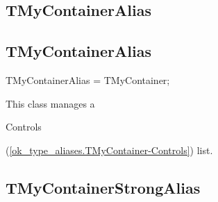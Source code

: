 \documentclass{report}
\newif\ifpdf
\begin{document}
\subsection*{\large{\textbf{TMyContainerAlias}}\normalsize\hspace{1ex}\hrulefill}
\else
\subsection*{TMyContainerAlias}
\fi
\label{ok_type_aliases-TMyContainerAlias}
\begin{list}{}{
\setlength{\itemindent}{0cm}
\setlength{\listparindent}{0cm}
\setlength{\leftmargin}{\evensidemargin}
\addtolength{\leftmargin}{\tmplength}
\settowidth{\labelsep}{X}
\addtolength{\leftmargin}{\labelsep}
\setlength{\labelwidth}{\tmplength}
}
\item[\textbf{Declaration}\hfill]
\ifpdf
\begin{flushleft}
\fi
\begin{ttfamily}
TMyContainerAlias = TMyContainer;\end{ttfamily}

\ifpdf
\end{flushleft}
\fi

\par
\item[\textbf{Description}]
This class manages a \begin{ttfamily}Controls\end{ttfamily}(\ref{ok_type_aliases.TMyContainer-Controls}) list.

\end{list}
\ifpdf
\subsection*{\large{\textbf{TMyContainerStrongAlias}}\normalsize\hspace{1ex}\hrulefill}
\else
\end{document}
